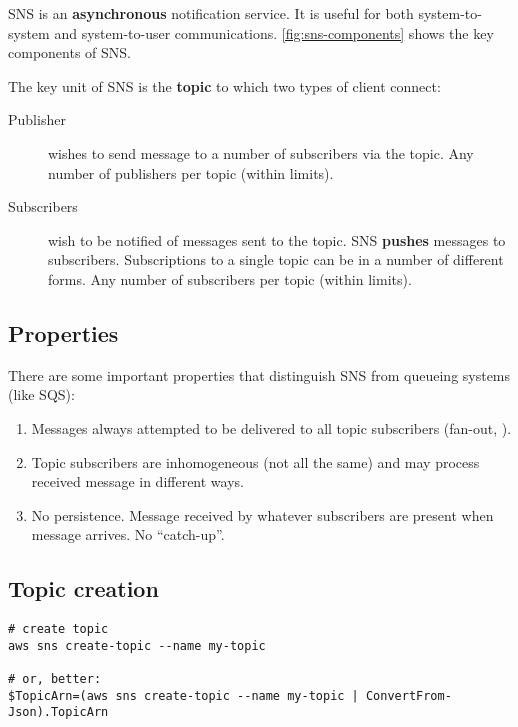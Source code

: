 SNS is an \textbf{asynchronous} notification service. It is useful for
both system-to-system and system-to-user communications. \autoref{fig:sns-components} shows the key
components of SNS.


The key unit of SNS is the \textbf{topic} to which two types of client
connect:

\begin{description}
\item[Publisher]
wishes to send message to a number of subscribers via the topic. Any
number of publishers per topic (within limits).
\item[Subscribers]
wish to be notified of messages sent to the topic. SNS \textbf{pushes}
messages to subscribers. Subscriptions to a single topic can be in a
number of different forms. Any number of subscribers per topic (within
limits).
\end{description}

\subsection{Properties}\label{properties}

There are some important properties that distinguish SNS from queueing
systems (like SQS):

\begin{enumerate}
\def\labelenumi{\arabic{enumi}.}
\item
  Messages always attempted to be delivered to all topic subscribers
  (fan-out, ).
\item
  Topic subscribers are inhomogeneous (not all the same) and may process
  received message in different ways.
\item
  No persistence. Message received by whatever subscribers are present
  when message arrives. No ``catch-up''.
\end{enumerate}

\subsection{Topic creation}\label{topic-creation}

\begin{verbatim}
# create topic
aws sns create-topic --name my-topic

# or, better:
$TopicArn=(aws sns create-topic --name my-topic | ConvertFrom-Json).TopicArn
\end{verbatim}

